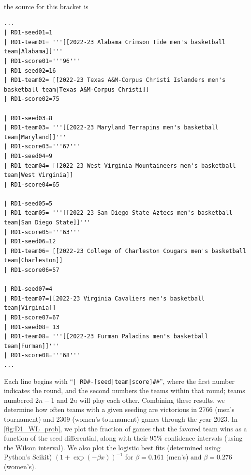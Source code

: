 \documentclass{article}
\begin{document}
the source for this bracket is
\begin{lstlisting}[basicstyle=\scriptsize,breaklines=true]
...
| RD1-seed01=1
| RD1-team01= '''[[2022-23 Alabama Crimson Tide men's basketball team|Alabama]]'''
| RD1-score01='''96'''
| RD1-seed02=16
| RD1-team02= [[2022-23 Texas A&M-Corpus Christi Islanders men's basketball team|Texas A&M-Corpus Christi]]
| RD1-score02=75
 
| RD1-seed03=8
| RD1-team03= '''[[2022-23 Maryland Terrapins men's basketball team|Maryland]]'''
| RD1-score03='''67'''
| RD1-seed04=9
| RD1-team04= [[2022-23 West Virginia Mountaineers men's basketball team|West Virginia]]
| RD1-score04=65
 
| RD1-seed05=5
| RD1-team05= '''[[2022-23 San Diego State Aztecs men's basketball team|San Diego State]]'''
| RD1-score05='''63'''
| RD1-seed06=12
| RD1-team06= [[2022-23 College of Charleston Cougars men's basketball team|Charleston]]
| RD1-score06=57
 
| RD1-seed07=4
| RD1-team07=[[2022-23 Virginia Cavaliers men's basketball team|Virginia]]
| RD1-score07=67
| RD1-seed08= 13
| RD1-team08= '''[[2022-23 Furman Paladins men's basketball team|Furman]]'''
| RD1-score08='''68'''
...
\end{lstlisting}
Each line begins with ``\texttt{| RD\#-[seed|team|score]\#\#}'', where the first number indicates the round, and the second numbers the teams within that round; teams numbered $2n-1$ and $2n$ will play each other.  Combining these results, we determine how often teams with a given seeding are victorious in 2766 (men's tournament) and 2309 (women's tournament) games through the year 2023. %
%
In \autoref{fig:D1_WL_prob}, we plot the fraction of games that the favored team wins as a function of the seed differential, along with their 95\% confidence intervals (using the Wilson interval\cite{Brown}).  We also plot the logistic best fits (determined using Python's Scikit\cite{scikit-learn}) $(1+\exp(-\beta x))^{-1}$ for $\beta=0.161$ (men's) and $\beta=0.276$ (women's).
\end{document}
